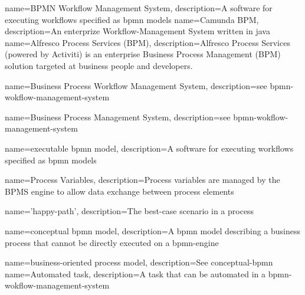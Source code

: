 {
	name={BPMN Workflow Management System},
	description={A software for executing workflows specified as \gls{bpmn} models}
}
{
	name={Camunda BPM},
	description={An enterprize Workflow-Management System written in java \cite{camunda-description}}
}
{
	name={Alfresco Process Services (BPM)},
	description={Alfresco Process Services (powered by Activiti) is an enterprise Business Process Management (BPM) solution targeted at business people and developers. \cite{alfresco-description}}
}


{
	name={Business Process Workflow Management System},
	description={see \gls{bpmn-wokflow-management-system}}
}

{
	name={Business Process Management System},
	description={see \gls{bpmn-wokflow-management-system}}
}

{
	name={executable \gls{bpmn} model},
	description={A software for executing workflows specified as \gls{bpmn} models}
}

{
	name={Process Variables},
	description={Process variables are managed by the BPMS engine to allow data exchange between process elements}
}

{
	name={'happy-path'},
	description={The best-case scenario in a process}
}

{
	name={conceptual \gls{bpmn} model},
	description={A \gls{bpmn} model describing a business process that cannot be directly executed on a \gls{bpmn-engine}}
}

{
	name={business-oriented process model},
	description={See \gls{conceptual-bpmn}}
}
{
	name={Automated task},
	description={A task that can be automated in a \gls{bpmn-wokflow-management-system}}
}

